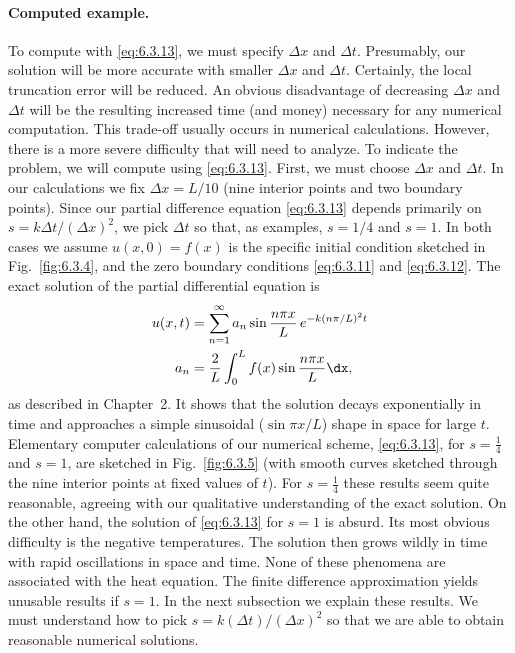 \paragraph{Computed example.}
To compute with \eqref{eq:6.3.13}, we must specify $\Delta x$ and $\Delta t$.  Presumably, our solution will be more accurate with smaller $\Delta x$ and $\Delta t$.  Certainly, the local truncation error will be reduced.  An obvious disadvantage of decreasing $\Delta x$ and $\Delta t$ will be the resulting increased time (and money) necessary for any numerical computation.  This trade-off usually occurs in numerical calculations.  However, there is a more severe difficulty that will need to analyze.  To indicate the problem, we will compute using \eqref{eq:6.3.13}.  First, we must choose $\Delta x$ and $\Delta t$.  In our calculations we fix $\Delta x = L/10$ (nine interior points and two boundary points).  Since our partial difference equation \eqref{eq:6.3.13} depends primarily on $s = k\Delta t/(\Delta x)^2$, we pick $\Delta t$ so that, as examples, $s = 1/4$ and $s = 1$.  In both cases we assume $u(x,0) = f(x)$ is the specific initial condition sketched in Fig.~\ref{fig:6.3.4}, and the zero boundary conditions \eqref{eq:6.3.11} and \eqref{eq:6.3.12}.  The exact solution of the partial differential equation is
\begin{equation}
\begin{aligned}
u(x,t) &= \sum_{n=1}^{\infty} a_n \sin\frac{n\pi x}{L}\,e^{-k(n\pi/L)^2 t} \\
a_n &= \frac{2}{L}\int_0^L f(x)\sin\frac{n\pi x}{L}\dx,
\end{aligned}
\label{eq:6.3.15}
\end{equation}
as described in Chapter~2.  It shows that the solution decays exponentially in time and approaches a simple sinusoidal ($\sin\pi x/L$) shape in space for large $t$.  Elementary computer calculations of our numerical scheme, \eqref{eq:6.3.13}, for $s = \frac{1}{4}$ and $s = 1$, are sketched in Fig.~\ref{fig:6.3.5} (with smooth curves sketched through the nine interior points at fixed values of $t$).  For $s = \frac{1}{4}$ these results seem quite reasonable, agreeing with our qualitative understanding of the exact solution.  On the other hand, the solution of \eqref{eq:6.3.13} for $s = 1$ is absurd.  Its most obvious difficulty is the negative temperatures.  The solution then grows wildly in time with rapid oscillations in space and time.  None of these phenomena are associated with the heat equation.  The finite difference approximation yields unusable results if $s = 1$.  In the next subsection we explain these results.  We must understand how to pick $s = k(\Delta t)/(\Delta x)^2$ so that we are able to obtain reasonable numerical solutions.

